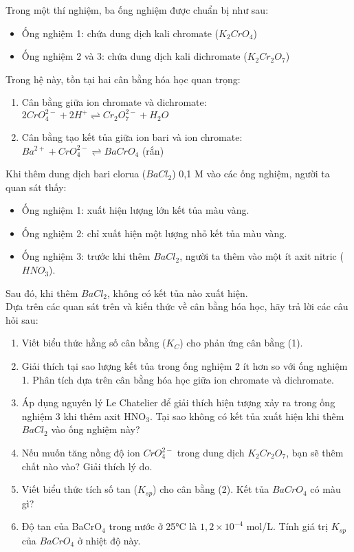\begin{bt}
	Trong một thí nghiệm, ba ống nghiệm được chuẩn bị như sau:
	\begin{itemize}
		\item Ống nghiệm 1: chứa dung dịch kali chromate ($K_2CrO_4$)
		\item Ống nghiệm 2 và 3: chứa dung dịch kali dichromate ($K_2Cr_2O_7$)
	\end{itemize}
	Trong hệ này, tồn tại hai cân bằng hóa học quan trọng:
	\begin{enumerate}
		\item Cân bằng giữa ion chromate và dichromate: 
		$2CrO_4^{2-} + 2H^+ \rightleftharpoons Cr_2O_7^{2-} + H_2O$
		\item Cân bằng tạo kết tủa giữa ion bari và ion chromate: 
		$Ba^{2+} + CrO_4^{2-} \rightleftharpoons BaCrO_4$ (rắn)
	\end{enumerate}
	Khi thêm dung dịch bari clorua ($BaCl_2$) 0,1 M vào các ống nghiệm, người ta quan sát thấy:
	\begin{itemize}
		\item Ống nghiệm 1: xuất hiện lượng lớn kết tủa màu vàng.
		\item Ống nghiệm 2: chỉ xuất hiện một lượng nhỏ kết tủa màu vàng.
		\item Ống nghiệm 3: trước khi thêm $BaCl_2$, người ta thêm vào một ít axit nitric ($HNO_3$).
	\end{itemize}
	Sau đó, khi thêm $BaCl_2$, không có kết tủa nào xuất hiện.
	\\
	Dựa trên các quan sát trên và kiến thức về cân bằng hóa học, hãy trả lời các câu hỏi sau:
	\begin{enumerate}
		\item Viết biểu thức hằng số cân bằng ($K_C$) cho phản ứng cân bằng (1).
		\item Giải thích tại sao lượng kết tủa trong ống nghiệm 2 ít hơn so với ống nghiệm 1. Phân tích dựa trên cân bằng hóa học giữa ion chromate và dichromate.
		\item Áp dụng nguyên lý Le Chatelier để giải thích hiện tượng xảy ra trong ống nghiệm 3 khi thêm axit HNO$_3$. Tại sao không có kết tủa xuất hiện khi thêm $BaCl_2$ vào ống nghiệm này?
		\item Nếu muốn tăng nồng độ ion $CrO_4^{2-}$ trong dung dịch $K_2Cr_2O_7$, bạn sẽ thêm chất nào vào? Giải thích lý do.
		\item Viết biểu thức tích số tan ($K_{sp}$) cho cân bằng (2). Kết tủa $BaCrO_4$ có màu gì?
		\item Độ tan của BaCrO$_4$ trong nước ở 25°C là $1{,}2 × 10^{-4}$ mol/L. Tính giá trị $K_{sp}$ của $BaCrO_4$ ở nhiệt độ này.

\end{enumerate}
\end{bt}

